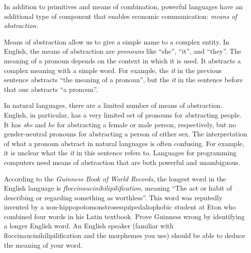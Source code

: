 In addition to primitives and means of combination, powerful languages have an additional type of component that enables economic communication: \emph{means of abstraction}. 

Means of abstraction allow us to give a simple name to a complex entity.  In English, the means of abstraction are \emph{pronouns} like ``she'', ``it'', and ``they''. The meaning of a pronoun depends on the context in which it is used.  It abstracts a complex meaning with a simple word.  For example, the \emph{it} in the previous sentence abstracts ``the meaning of a pronoun'', but the \emph{it} in the sentence before that one abstracts ``a pronoun''.  

In natural languages, there are a limited number of means of abstraction.  English, in particular, has a very limited set of pronouns for abstracting people.  It has \emph{she} and \emph{he} for abstracting a female or male person, respectively, but no gender-neutral pronouns for abstracting a person of either sex.  The interpretation of what a pronoun abstract in natural languages is often confusing.  For example, it is unclear what the \emph{it} in this sentence refers to.  Languages for programming computers need means of abstraction that are both powerful and unambiguous.

\beforeex
\begin{exercise}\label{ex:newforms}
According to the \emph{Guinness Book of World Records}, the longest word in the English language is \emph{floccinaucinihilipilification}, meaning ``The act or habit of describing or regarding something as worthless''.  This word was reputedly invented by a non-hip\-po\-poto\-mon\-stro\-se\-squipe\-da\-li\-o\-pho\-bic student at Eton who combined four words in his Latin textbook.  Prove Guinness wrong by identifying a longer English word.  An English speaker (familiar with flocci\-nauci\-ni\-hil\-ipili\-fi\-ca\-tion and the morphemes you use) should be able to deduce the meaning of your word.


\end{exercise}
\afterex

